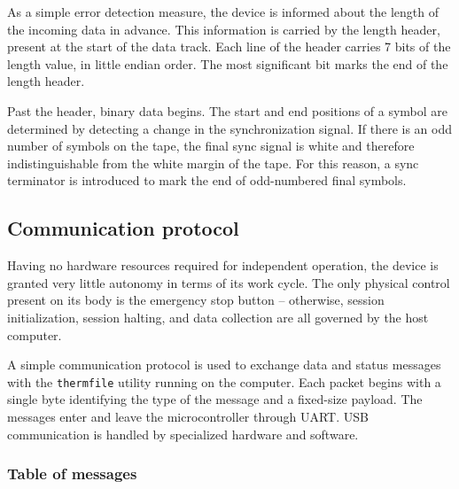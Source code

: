 \documentclass{article}
\begin{document}
	As a simple error detection measure, the device is informed about the
	length of the incoming data in advance. This information is carried by the
	length header, present at the start of the data track. Each line of the
	header carries 7 bits of the length value, in little endian order. The
	most significant bit marks the end of the length header.
	
	Past the header, binary data begins. The start and end positions of a
	symbol are determined by detecting a change in the synchronization signal.
	If there is an odd number of symbols on the tape, the final sync signal is
	white and therefore indistinguishable from the white margin of the tape.
	For this reason, a sync terminator is introduced to mark the end of
	odd-numbered final symbols.
	
	\subsection{Communication protocol}
	
	Having no hardware resources required for independent operation, the device
	is granted very little autonomy in terms of its work cycle. The only
	physical control present on its body is the emergency stop button --
	otherwise, session initialization, session halting, and data collection are
	all governed by the host computer.
	
	A simple communication protocol is used to exchange data and status
	messages with the \texttt{thermfile} utility running on the computer. Each
	packet begins with a single byte identifying the type of the message and a
	fixed-size payload. The messages enter and leave the microcontroller
	through UART. USB communication is handled by specialized hardware and
	software.
	
	\subsubsection{Table of messages}
	
\end{document}
